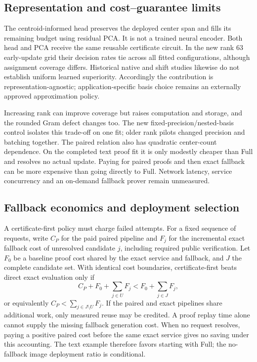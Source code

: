 \subsection{Representation and cost--guarantee limits}
The centroid-informed head preserves the deployed center span and fills its
remaining budget using residual PCA. It is not a trained neural encoder.
Both head and PCA receive the same reusable certificate circuit. In the new
rank 63 early-update grid their decision rates tie across all fitted
configurations, although assignment coverage differs. Historical native and
shift studies likewise do not establish uniform learned superiority.
Accordingly the contribution is representation-agnostic; application-specific
basis choice remains an externally approved approximation policy.

Increasing rank can improve coverage but raises computation and storage, and
the rounded Gram defect changes too. The new fixed-precision/nested-basis
control isolates this trade-off on one fit; older rank pilots changed
precision and batching together. The paired relation also has quadratic
center-count dependence. On the completed text proof fit it is only modestly
cheaper than Full and resolves no actual update. Paying for paired proofs and
then exact fallback can be more expensive than going directly to Full.
Network latency, service concurrency and an on-demand fallback prover remain
unmeasured.

\subsection{Fallback economics and deployment selection}
A certificate-first policy must charge failed attempts. For a fixed sequence
of requests, write $C_P$ for the paid paired pipeline and $F_j$ for the
incremental exact fallback cost of unresolved candidate $j$, including required
public verification. Let $F_0$ be a baseline proof cost shared by the exact
service and fallback, and $J$ the complete candidate set. With identical cost
boundaries, certificate-first beats direct exact evaluation only if
\begin{equation}
 C_P+F_0+\sum_{j\in U}F_j < F_0+\sum_{j\in J}F_j,
\end{equation}
or equivalently $C_P<\sum_{j\in J\setminus U}F_j$. If the paired and exact
pipelines share additional work, only measured reuse may be credited. A proof
replay time alone cannot supply the missing fallback generation cost. When no
request resolves, paying a positive paired cost before the same exact service
gives no saving under this accounting. The text example therefore favors
starting with Full; the no-fallback image deployment ratio is conditional.

